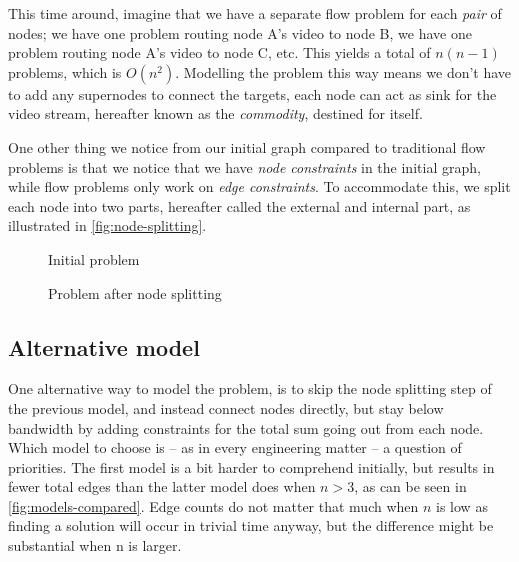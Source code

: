 This time around, imagine that we have a separate flow problem for each \emph{pair} of nodes; we have one problem routing node A's video to node B, we have one problem routing node A's video to node C, etc. This yields a total of $n(n-1)$ problems, which is $O(n^2)$. Modelling the problem this way means we don't have to add any supernodes to connect the targets, each node can act as sink for the video stream, hereafter known as the \emph{commodity}, destined for itself.

One other thing we notice from our initial graph compared to traditional flow problems is that we notice that we have \emph{node constraints} in the initial graph, while flow problems only work on \emph{edge constraints}. To accommodate this, we split each node into two parts, hereafter called the external and internal part, as illustrated in \autoref{fig:node-splitting}.

\begin{figure}[ht!]
\centering
    \caption{Initial problem}
\end{figure}

\begin{figure}[ht!]
\centering
    \caption{Problem after node splitting}
\end{figure}


\subsection{Alternative model}

One alternative way to model the problem, is to skip the node splitting step of the previous model, and instead connect nodes directly, but stay below bandwidth by adding constraints for the total sum going out from each node. Which model to choose is -- as in every engineering matter -- a question of priorities. The first model is a bit harder to comprehend initially, but results in fewer total edges than the latter model does when $n>3$, as can be seen in \autoref{fig:models-compared}. Edge counts do not matter that much when $n$ is low as finding a solution will occur in trivial time anyway, but the difference might be substantial when n is larger. 

